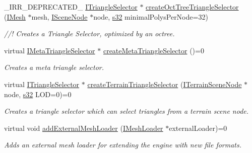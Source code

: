 \begin{DoxyCompactItemize}
\+\_\+\+I\+R\+R\+\_\+\+D\+E\+P\+R\+E\+C\+A\+T\+E\+D\+\_\+ \hyperlink{classirr_1_1scene_1_1ITriangleSelector}{I\+Triangle\+Selector} $\ast$ \hyperlink{classirr_1_1scene_1_1ISceneManager_a67f20d1a535645048f2f7e2b5c670656}{create\+Oct\+Tree\+Triangle\+Selector} (\hyperlink{classirr_1_1scene_1_1IMesh}{I\+Mesh} $\ast$mesh, \hyperlink{classirr_1_1scene_1_1ISceneNode}{I\+Scene\+Node} $\ast$node, \hyperlink{namespaceirr_ac66849b7a6ed16e30ebede579f9b47c6}{s32} minimal\+Polys\+Per\+Node=32)
\begin{DoxyCompactList}\small\item\em //! Creates a Triangle Selector, optimized by an octree. \end{DoxyCompactList}\item 
virtual \hyperlink{classirr_1_1scene_1_1IMetaTriangleSelector}{I\+Meta\+Triangle\+Selector} $\ast$ \hyperlink{classirr_1_1scene_1_1ISceneManager_aee99e59dc55fe9f8c3507df68f84a9ff}{create\+Meta\+Triangle\+Selector} ()=0
\begin{DoxyCompactList}\small\item\em Creates a meta triangle selector. \end{DoxyCompactList}\item 
virtual \hyperlink{classirr_1_1scene_1_1ITriangleSelector}{I\+Triangle\+Selector} $\ast$ \hyperlink{classirr_1_1scene_1_1ISceneManager_af52f8c74e08637b7643d239542371bc5}{create\+Terrain\+Triangle\+Selector} (\hyperlink{classirr_1_1scene_1_1ITerrainSceneNode}{I\+Terrain\+Scene\+Node} $\ast$node, \hyperlink{namespaceirr_ac66849b7a6ed16e30ebede579f9b47c6}{s32} L\+OD=0)=0
\begin{DoxyCompactList}\small\item\em Creates a triangle selector which can select triangles from a terrain scene node. \end{DoxyCompactList}\item 
virtual void \hyperlink{classirr_1_1scene_1_1ISceneManager_a808972cc001db86c0576c38b3b3fbbf7}{add\+External\+Mesh\+Loader} (\hyperlink{classirr_1_1scene_1_1IMeshLoader}{I\+Mesh\+Loader} $\ast$external\+Loader)=0
\begin{DoxyCompactList}\small\item\em Adds an external mesh loader for extending the engine with new file formats. \end{DoxyCompactList}\item 
\mbox{\label{classirr_1_1scene_1_1ISceneManager_abb3fc9803b7de0cf7177042bd24508ad}} 

\end{DoxyCompactItemize}
